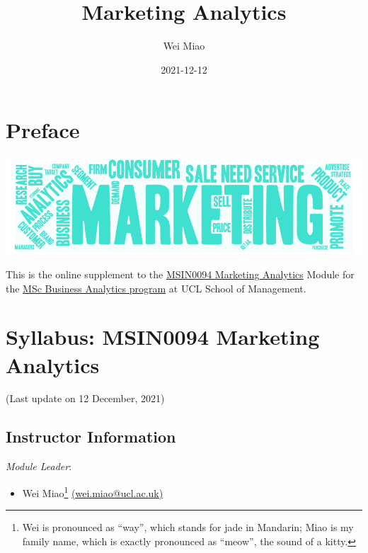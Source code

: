 \documentclass[
  11pt,
]{book}
\title{Marketing Analytics}
\author{Wei Miao}
\date{2021-12-12}
\providecommand{\tightlist}{%
  \setlength{\itemsep}{0pt}\setlength{\parskip}{0pt}}
\begin{document}
\maketitle

{
\setcounter{tocdepth}{1}
\tableofcontents
}
\hypertarget{preface}{%
\chapter{Preface}\label{preface}}

\begin{center}\includegraphics{images/MarketingAnalyticsWordCloud} \end{center}

This is the online supplement to the \href{https://www.ucl.ac.uk/module-catalogue/modules/marketing-analytics/MSIN0094}{MSIN0094 Marketing Analytics} Module for the \href{http://www.mgmt.ucl.ac.uk/business-analytics}{MSc Business Analytics program} at UCL School of Management.

\hypertarget{syllabus-msin0094-marketing-analytics}{%
\chapter{Syllabus: MSIN0094 Marketing Analytics}\label{syllabus-msin0094-marketing-analytics}}

(Last update on 12 December, 2021)

\hypertarget{instructor-information}{%
\section{Instructor Information}\label{instructor-information}}

\emph{Module Leader}:

\begin{itemize}
\tightlist
\item
  Wei Miao\footnote{Wei is pronounced as ``way'', which stands for jade in Mandarin; Miao is my family name, which is exactly pronounced as ``meow'', the sound of a kitty.} \href{mailto:wei.miao@ucl.ac.uk}{(wei.miao@ucl.ac.uk)}
\end{itemize}
\end{document}
